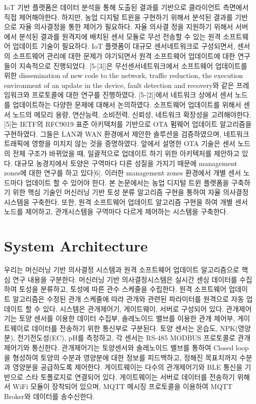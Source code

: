 \documentclass[11pt]{article}
\begin{document}
IoT 기반 플랫폼은 데이터 분석을 통해 도출된 결과를 기반으로 클라이언트 측면에서 직접 제어해야한다. 하지만, 농업 디지털 트윈을 구현하기 위해서 분석된 결과를 기반으로 자율 의사결정을 통한 제어가 필요하다. 자율 의사결 정을 지원하기 위해서 서버에서 분석된 결과를 원격지에 배치된 센서 모듈로 무선 전송할 수 있는 원격 소프트웨어 업데이트 기술이 필요하다. IoT 플랫폼이 대규모 센서네트워크로 구성되면서, 센서의 소프트웨어 관리에 대한 문제가 야기되면서 원격 소프트웨어 업데이트에 대한 연구들이 지속적으로 진행되었다.
[5-[3]]은 무선센서네트워크에서 소프트웨어 업데이트를 위한 dissemination of new code to the network, traffic reduction, the execution environment of an update in the device, fault detection and recovery와 같은 프레임워크와 프로토콜에 대한 연구를 진행하였다. [5-[2]]에서 네트워크 상에서 센서 노드를 업데이트하는 다양한 문제에 대해서 논의하였다. 소프트웨어 업데이트를 위해서 센서 노드의 메모리 용량, 연산능력, 소비전력, 신뢰성, 네트워크 확장성을 고려해야한다. [5]는 IETF의 RFC9019 표준 아키텍처를 기반으로 OTA 펌웨어 업데이트 알고리즘을 구현하였다. 그들은 LAN과 WAN 환경에서 제안한 솔루션을 검증하였으며, 네트워크 트래픽에 영향을 미치지 않는 것을 증명하였다. 앞에서 설명한 OTA 기술은 센서 노드의 전체 구조가 바뀌었을 때, 일괄적으로 업데이트 하기 위한 아키텍처를 제안하고 있다. 대규모 농경지에서 토양은 구역마다 다른 성질을 가지기 때문에 management zones에 대한 연구를 하고 있다[6]. 이러한 management zones 환경에서 개별 센서 노드마다 업데이트 할 수 있어야 한다. 본 논문에서는 농업 디지털 트윈 플랫폼을 구축하기 위한 핵심 기술인 머신러닝 기반 토성 분류 알고리즘 구현을 통하여 자율 의사결정 시스템을 구축한다. 또한, 원격 소프트웨어 업데이트 알고리즘 구현을 하여 개별 센서 노드를 제어하고, 관개시스템을 구역마다 다르게 제어하는 시스템을 구축한다.

\section{System Architecture}
우리는 머신러닝 기반 의사결정 시스템과 원격 소프트웨어 업데이트 알고리즘으로 핵심 연구 내용을 구분한다. 머신러닝 기반 의사결정시스템은 실시간 센싱 데이터를 수집하여 토성을 분류하고, 토성에 따른 관수 스케줄을 수립한다. 원격 소프트웨어 업데이트 알고리즘은 수정된 관개 스케줄에 따라 관개와 관련된 파라미터를 원격으로 자동 업데이트 할 수 있다. 시스템은 관개제어기, 게이트웨이, 서버로 구성되어 있다. 관개제어기는 토양 센서를 이용한 데이터 수집부, 솔레노이드 밸브를 이용한 관개 제어부, 게이트웨이로 데이터를 전송하기 위한 통신부로 구분된다. 토양 센서는 온습도, NPK(영양분), 전기전도성(EC), pH를 측정하고, 각 센서는 RS-485 MODBUS 프로토콜로 관개제어기와 통신한다. 관개제어기는 토양센서와 솔레노이드 밸브를 통하여 Closed loop을 형성하여 토양의 수분과 영양분에 대한 정보를 피드백하고, 정해진 목표치까지 수분과 영양분을 공급하도록 제어한다. 게이트웨이는 다수의 관개제어기와 BLE 통신을 기반으로 스타 토폴로지로 연결되어 있다. 게이트웨이는 서버로 데이터를 전송하기 위해서 WiFi 모듈이 장착되어 있으며, MQTT 메시징 프로토콜을 이용하여 MQTT Broker와 데이터를 송수신한다.
\end{document}
